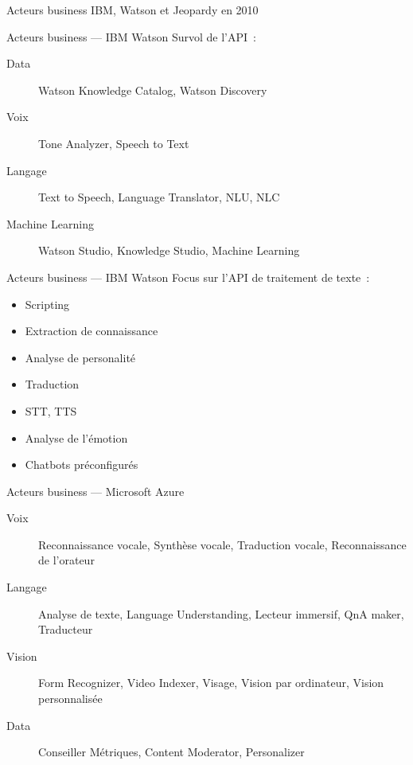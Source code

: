 \begin{frame}{Acteurs business}
  IBM, Watson et Jeopardy en 2010
\end{frame}

\begin{frame}{Acteurs business --- IBM Watson}
  Survol de l'API~:
  \begin{description}
    \item[Data] Watson Knowledge Catalog, Watson Discovery
    \item[Voix] Tone Analyzer, Speech to Text
    \item[Langage] Text to Speech, Language Translator, NLU, NLC
    \item[Machine Learning] Watson Studio, Knowledge Studio, Machine Learning
  \end{description}
\end{frame}

\begin{frame}{Acteurs business --- IBM Watson}
  Focus sur l'API de traitement de texte~:
  \begin{minipage}[c]{0.49\linewidth}
    \begin{itemize}
    \item Scripting
    \item Extraction de connaissance
    \item Analyse de personalité
    \item Traduction
    \end{itemize}
  \end{minipage}\hfill
  \begin{minipage}[c]{0.50\linewidth}
    \begin{itemize}
    \item STT, TTS
    \item Analyse de l'émotion
    \item Chatbots préconfigurés
    \end{itemize}
  \end{minipage}\hfill
\end{frame}

\begin{frame}{Acteurs business --- Microsoft Azure}
  \begin{description}
    \item[Voix] Reconnaissance vocale, Synthèse vocale, Traduction vocale, Reconnaissance de l'orateur
    \item[Langage] Analyse de texte, Language Understanding, Lecteur immersif, QnA maker, Traducteur
    \item[Vision] Form Recognizer, Video Indexer, Visage, Vision par ordinateur, Vision personnalisée
    \item[Data] Conseiller Métriques, Content Moderator, Personalizer
  \end{description}
\end{frame}

